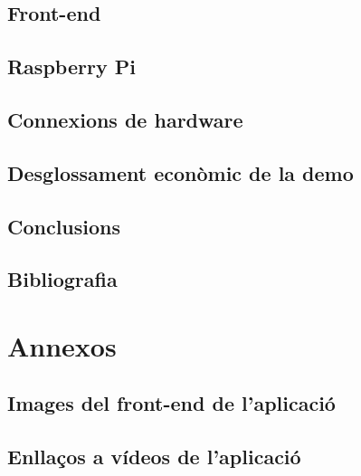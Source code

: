 \chapter{Front-end}


\chapter{Raspberry Pi}


\chapter{Connexions de hardware}


\chapter{Desglossament econòmic de la demo}


\chapter{Conclusions}


\chapter{Bibliografia}
\printbibliography[heading=none]

\part{Annexos}

\appendix

\chapter{Images del front-end de l'aplicació}


\chapter{Enllaços a vídeos de l'aplicació}




